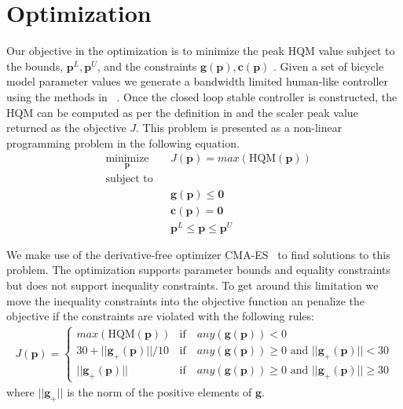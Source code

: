 \documentclass{bmd2019a}
\begin{document}
\section{Optimization}
%
Our objective in the optimization is to minimize the peak HQM value subject to
the bounds, $\mathbf{p}^L,\mathbf{p}^U$, and the constraints
$\mathbf{g}(\mathbf{p}),\mathbf{c}(\mathbf{p})$ . Given a set of bicycle model
parameter values we generate a bandwidth limited human-like controller using
the methods in ~\cite{Moore2012}. Once the closed loop stable controller is
constructed, the HQM can be computed as per the definition in \cite{Hess2012}
and the scaler peak value returned as the objective $J$. This problem is
presented as a non-linear programming problem in the following equation.
%
\begin{equation}
  \begin{aligned}
    & \underset{\mathbf{p}}{\text{minimize}} & & J(\mathbf{p})=max(\textrm{HQM}(\mathbf{p})) \\
    & \text{subject to} & & \\
    & & & \mathbf{g}(\mathbf{p}) \leq \mathbf{0} \\
    & & & \mathbf{c}(\mathbf{p}) = \mathbf{0} \\
    & & & \mathbf{p}^L \leq \mathbf{p} \leq \mathbf{p}^U
  \end{aligned}
\end{equation}

We make use of the derivative-free optimizer CMA-ES~\cite{Hansen1996} to find
solutions to this problem. The optimization supports parameter bounds and
equality constraints but does not support inequality constraints. To get around
this limitation we move the inequality constraints into the objective function
an penalize the objective if the constraints are violated with the following
rules:
%
\begin{align}
  J(\mathbf{p}) =
  \begin{cases}
    max(\textrm{HQM}(\mathbf{p})) & \textrm{if} \quad any(\mathbf{g}(\mathbf{p})) < 0 \\
    30 + ||\mathbf{g}_{+}(\mathbf{p})||/10 & \textrm{if} \quad
      any(\mathbf{g}(\mathbf{p})) \geq 0 \textrm{ and } ||\mathbf{g}_{+}(\mathbf{p})|| < 30 \\
    ||\mathbf{g}_{+}(\mathbf{p})|| & \textrm{if} \quad
      any(\mathbf{g}(\mathbf{p})) \geq 0 \textrm{ and } ||\mathbf{g}_{+}(\mathbf{p})|| \geq 30
  \end{cases}
\end{align}
where $||\mathbf{g}_{+}||$ is the norm of the positive elements of
$\mathbf{g}$.
\end{document}
